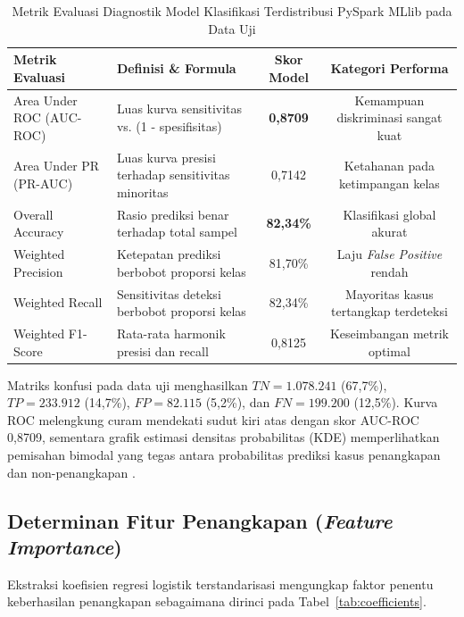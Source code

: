 \documentclass[11pt,a4paper]{article}
\begin{document}
\begin{table}[h]
\centering
\small
\caption{Metrik Evaluasi Diagnostik Model Klasifikasi Terdistribusi PySpark MLlib pada Data Uji}
\label{tab:ml_eval}
\begin{tabularx}{\textwidth}{lXcc}
\toprule
\textbf{Metrik Evaluasi} & \textbf{Definisi \& Formula} & \textbf{Skor Model} & \textbf{Kategori Performa} \\
\midrule
Area Under ROC (AUC-ROC) & Luas kurva sensitivitas vs. (1 - spesifisitas) & \textbf{0,8709} & Kemampuan diskriminasi sangat kuat \\
Area Under PR (PR-AUC) & Luas kurva presisi terhadap sensitivitas minoritas & 0,7142 & Ketahanan pada ketimpangan kelas \\
Overall Accuracy & Rasio prediksi benar terhadap total sampel & \textbf{82,34\%} & Klasifikasi global akurat \\
Weighted Precision & Ketepatan prediksi berbobot proporsi kelas & 81,70\% & Laju \textit{False Positive} rendah \\
Weighted Recall & Sensitivitas deteksi berbobot proporsi kelas & 82,34\% & Mayoritas kasus tertangkap terdeteksi \\
Weighted F1-Score & Rata-rata harmonik presisi dan recall & 0,8125 & Keseimbangan metrik optimal \\
\bottomrule
\end{tabularx}
\end{table}

Matriks konfusi pada data uji menghasilkan $TN = 1.078.241$ (67,7\%), $TP = 233.912$ (14,7\%), $FP = 82.115$ (5,2\%), dan $FN = 199.200$ (12,5\%). Kurva ROC melengkung curam mendekati sudut kiri atas dengan skor AUC-ROC 0,8709, sementara grafik estimasi densitas probabilitas (KDE) memperlihatkan pemisahan bimodal yang tegas antara probabilitas prediksi kasus penangkapan dan non-penangkapan \cite{djon2023}.

\subsection{Determinan Fitur Penangkapan (\textit{Feature Importance})}
Ekstraksi koefisien regresi logistik terstandarisasi mengungkap faktor penentu keberhasilan penangkapan sebagaimana dirinci pada Tabel~\ref{tab:coefficients}.
\end{document}
